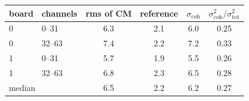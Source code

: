 \begin{tabular}{llcccc}
\toprule
board & channels & rms of CM & reference & $\sigma_\mathrm{coh}$ & $\sigma_\mathrm{coh}^2/\sigma_\mathrm{tot}^2$ \\
\midrule
0 & 0--31 & 6.3 & 2.1 & 6.0 & 0.25 \\
0 & 32--63 & 7.4 & 2.2 & 7.2 & 0.33 \\
1 & 0--31 & 5.7 & 1.9 & 5.5 & 0.26 \\
1 & 32--63 & 6.8 & 2.3 & 6.5 & 0.28 \\
\midrule
\multicolumn{2}{l}{median} & 6.5 & 2.2 & 6.2 & 0.27 \\
\bottomrule
\end{tabular}
